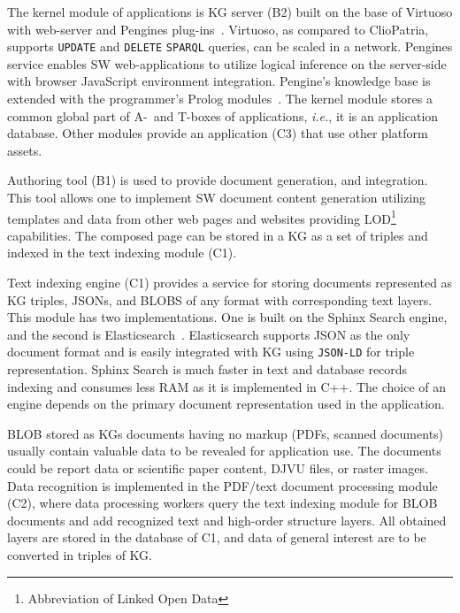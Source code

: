 \documentclass[
]{aiitart}
\begin{document}
The kernel module of applications is KG server (B2) built on the base of Virtuoso with web-server and Pengines plug-ins~\cite{pengines}.  %
Virtuoso, as compared to ClioPatria, supports \verb|UPDATE| and \verb|DELETE| \verb|SPARQL| queries, can be scaled in a network.  Pengines service enables SW web-applications to utilize logical inference on the server-side with browser JavaScript environment integration.  Pengine's knowledge base is extended with the programmer's Prolog modules~\cite{b10,swi}.  The kernel module stores a common global part of A-~and T-boxes of applications, \emph{i.e.}, it is an application database.  Other modules provide an application (C3) that use other platform assets.

Authoring tool (B1) \cite{authoring,zont19} is used to provide document generation, and integration.  This tool allows one to implement SW document content generation utilizing templates and data from other web pages and websites providing LOD\footnote{Abbreviation of Linked Open Data} \cite{b1,c6} capabilities. The composed page can be stored in a KG as a set of triples and indexed in the text indexing module (C1).

Text indexing engine (C1) provides a service for storing documents represented as KG triples, JSONs, and BLOBS of any format with corresponding text layers.  This module has two implementations.  One is built on the Sphinx Search engine, and the second is Elasticsearch~\cite{b13}.  Elasticsearch supports JSON as the only document format and is easily integrated with KG using \verb|JSON-LD| for triple representation.  Sphinx Search is much faster in text and database records indexing and consumes less RAM as it is implemented in C++. The choice of an engine depends on the primary document representation used in the application.

BLOB stored as KGs documents having no markup (PDFs, scanned documents) usually contain valuable data to be revealed for application use.  The documents could be report data or scientific paper content, DJVU files, or raster images.  Data recognition is implemented in the PDF/text document processing module (C2), where data processing workers query the text indexing module for BLOB documents and add recognized text and high-order structure layers.  All obtained layers are stored in the database of C1, and data of general interest are to be converted in triples of KG.
\end{document}
